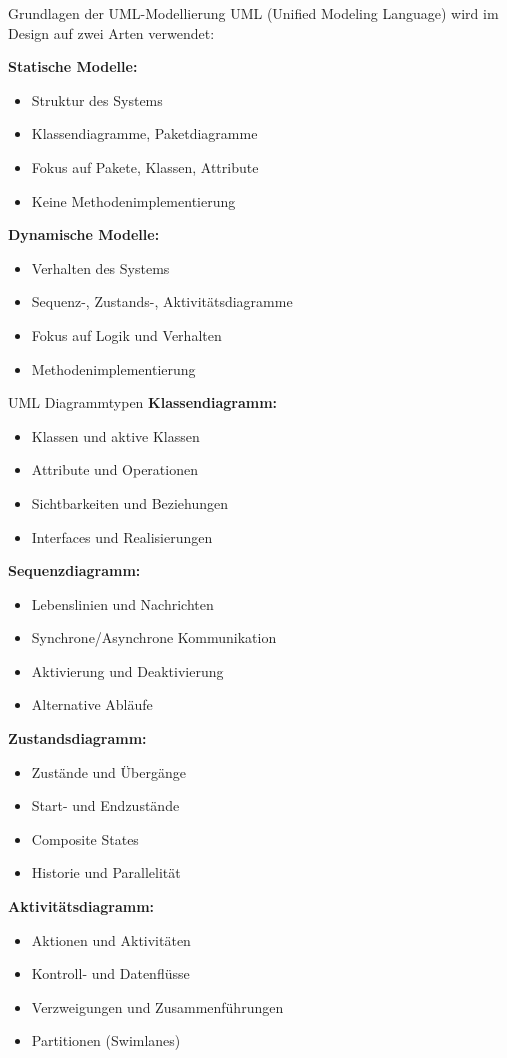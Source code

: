 \begin{concept}{Grundlagen der UML-Modellierung}
UML (Unified Modeling Language) wird im Design auf zwei Arten verwendet:

\textbf{Statische Modelle:}
\begin{itemize}
    \item Struktur des Systems
    \item Klassendiagramme, Paketdiagramme
    \item Fokus auf Pakete, Klassen, Attribute
    \item Keine Methodenimplementierung
\end{itemize}

\textbf{Dynamische Modelle:}
\begin{itemize}
    \item Verhalten des Systems
    \item Sequenz-, Zustands-, Aktivitätsdiagramme
    \item Fokus auf Logik und Verhalten
    \item Methodenimplementierung
\end{itemize}
\end{concept}

\begin{concept}{UML Diagrammtypen}
\textbf{Klassendiagramm:}
\begin{itemize}
    \item Klassen und aktive Klassen
    \item Attribute und Operationen
    \item Sichtbarkeiten und Beziehungen
    \item Interfaces und Realisierungen
\end{itemize}

\textbf{Sequenzdiagramm:}
\begin{itemize}
    \item Lebenslinien und Nachrichten
    \item Synchrone/Asynchrone Kommunikation
    \item Aktivierung und Deaktivierung
    \item Alternative Abläufe
\end{itemize}

\textbf{Zustandsdiagramm:}
\begin{itemize}
    \item Zustände und Übergänge
    \item Start- und Endzustände
    \item Composite States
    \item Historie und Parallelität
\end{itemize}

\textbf{Aktivitätsdiagramm:}
\begin{itemize}
    \item Aktionen und Aktivitäten
    \item Kontroll- und Datenflüsse
    \item Verzweigungen und Zusammenführungen
    \item Partitionen (Swimlanes)
\end{itemize}
\end{concept}

